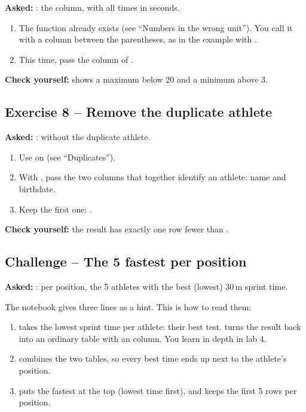 \documentclass[11pt,a4paper]{article}
\begin{document}
\textbf{Asked:} : the  column,
with all times in seconds.

\begin{enumerate}
  \item The function  already exists (see
        ``Numbers in the wrong unit''). You call it with a column between
        the parentheses, as in the example with .
  \item This time, pass the  column of
        .
\end{enumerate}

\textbf{Check yourself:}  shows a
maximum below 20 and a minimum above 3.

\subsection*{Exercise 8 -- Remove the duplicate athlete}

\textbf{Asked:} :  without the
duplicate athlete.

\begin{enumerate}
  \item Use  on  (see
        ``Duplicates'').
  \item With , pass the two columns that together
        identify an athlete: name and birthdate.
  \item Keep the first one: .
\end{enumerate}

\textbf{Check yourself:} the result has exactly one row fewer than
.

\subsection*{Challenge -- The 5 fastest per position}

\textbf{Asked:} : per position, the 5
athletes with the best (lowest) 30\,m sprint time.

The notebook gives three lines as a hint. This is how to read them:

\begin{enumerate}
  \item {}
        takes the lowest sprint time per athlete: their best test.
         turns the result back into an ordinary
        table with an  column. You learn 
        in depth in lab 4.
  \item {}
        combines the two tables, so every best time ends up next to the
        athlete's position.
  \item {} puts the fastest at the top
        (lowest time first), and  keeps
        the first 5 rows per position.
\end{enumerate}
\end{document}
